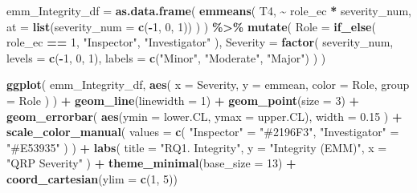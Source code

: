 \documentclass[
]{article}
\newenvironment{Shaded}{\begin{snugshade}}{\end{snugshade}}
\newcommand{\AttributeTok}[1]{\textcolor[rgb]{0.13,0.29,0.53}{#1}}
\newcommand{\DecValTok}[1]{\textcolor[rgb]{0.00,0.00,0.81}{#1}}
\newcommand{\FloatTok}[1]{\textcolor[rgb]{0.00,0.00,0.81}{#1}}
\newcommand{\FunctionTok}[1]{\textcolor[rgb]{0.13,0.29,0.53}{\textbf{#1}}}
\newcommand{\NormalTok}[1]{#1}
\newcommand{\OtherTok}[1]{\textcolor[rgb]{0.56,0.35,0.01}{#1}}
\newcommand{\SpecialCharTok}[1]{\textcolor[rgb]{0.81,0.36,0.00}{\textbf{#1}}}
\newcommand{\StringTok}[1]{\textcolor[rgb]{0.31,0.60,0.02}{#1}}
\begin{document}
\begin{Shaded}
\begin{Highlighting}[]
\NormalTok{emm\_Integrity\_df }\OtherTok{=} \FunctionTok{as.data.frame}\NormalTok{(}
  \FunctionTok{emmeans}\NormalTok{(}
\NormalTok{    T4,}
    \SpecialCharTok{\textasciitilde{}}\NormalTok{ role\_ec }\SpecialCharTok{*}\NormalTok{ severity\_num,}
    \AttributeTok{at =} \FunctionTok{list}\NormalTok{(}\AttributeTok{severity\_num =} \FunctionTok{c}\NormalTok{(}\SpecialCharTok{{-}}\DecValTok{1}\NormalTok{, }\DecValTok{0}\NormalTok{, }\DecValTok{1}\NormalTok{))}
\NormalTok{  )}
\NormalTok{) }\SpecialCharTok{\%\textgreater{}\%}
  \FunctionTok{mutate}\NormalTok{(}
    \AttributeTok{Role =} \FunctionTok{if\_else}\NormalTok{(}
\NormalTok{      role\_ec }\SpecialCharTok{==} \DecValTok{1}\NormalTok{,}
      \StringTok{"Inspector"}\NormalTok{,}
      \StringTok{"Investigator"}
\NormalTok{    ),}
    \AttributeTok{Severity =} \FunctionTok{factor}\NormalTok{(}
\NormalTok{      severity\_num,}
      \AttributeTok{levels =} \FunctionTok{c}\NormalTok{(}\SpecialCharTok{{-}}\DecValTok{1}\NormalTok{, }\DecValTok{0}\NormalTok{, }\DecValTok{1}\NormalTok{),}
      \AttributeTok{labels =} \FunctionTok{c}\NormalTok{(}\StringTok{"Minor"}\NormalTok{, }\StringTok{"Moderate"}\NormalTok{, }\StringTok{"Major"}\NormalTok{)}
\NormalTok{    )}
\NormalTok{  )}

\FunctionTok{ggplot}\NormalTok{(}
\NormalTok{  emm\_Integrity\_df,}
  \FunctionTok{aes}\NormalTok{(}
    \AttributeTok{x =}\NormalTok{ Severity,}
    \AttributeTok{y =}\NormalTok{ emmean,}
    \AttributeTok{color =}\NormalTok{ Role,}
    \AttributeTok{group =}\NormalTok{ Role}
\NormalTok{  )}
\NormalTok{) }\SpecialCharTok{+}
  \FunctionTok{geom\_line}\NormalTok{(}\AttributeTok{linewidth =} \DecValTok{1}\NormalTok{) }\SpecialCharTok{+}
  \FunctionTok{geom\_point}\NormalTok{(}\AttributeTok{size =} \DecValTok{3}\NormalTok{) }\SpecialCharTok{+}
  \FunctionTok{geom\_errorbar}\NormalTok{(}
    \FunctionTok{aes}\NormalTok{(}\AttributeTok{ymin =}\NormalTok{ lower.CL, }\AttributeTok{ymax =}\NormalTok{ upper.CL),}
    \AttributeTok{width =} \FloatTok{0.15}
\NormalTok{  ) }\SpecialCharTok{+}
  \FunctionTok{scale\_color\_manual}\NormalTok{(}
    \AttributeTok{values =} \FunctionTok{c}\NormalTok{(}
      \StringTok{"Inspector"} \OtherTok{=} \StringTok{"\#2196F3"}\NormalTok{,}
      \StringTok{"Investigator"} \OtherTok{=} \StringTok{"\#E53935"}
\NormalTok{    )}
\NormalTok{  ) }\SpecialCharTok{+}
  \FunctionTok{labs}\NormalTok{(}
    \AttributeTok{title =} \StringTok{"RQ1. Integrity"}\NormalTok{,}
    \AttributeTok{y =} \StringTok{"Integrity (EMM)"}\NormalTok{,}
    \AttributeTok{x =} \StringTok{"QRP Severity"}
\NormalTok{  ) }\SpecialCharTok{+}
  \FunctionTok{theme\_minimal}\NormalTok{(}\AttributeTok{base\_size =} \DecValTok{13}\NormalTok{) }\SpecialCharTok{+}
  \FunctionTok{coord\_cartesian}\NormalTok{(}\AttributeTok{ylim =} \FunctionTok{c}\NormalTok{(}\DecValTok{1}\NormalTok{, }\DecValTok{5}\NormalTok{))}
\end{Highlighting}
\end{Shaded}
\end{document}
